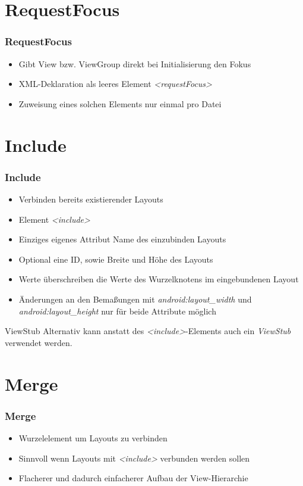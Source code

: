 \section{RequestFocus}
\begin{frame}
   \frametitle{RequestFocus}
   \begin{itemize}
      \item Gibt View bzw. ViewGroup direkt bei Initialisierung den Fokus
      \item XML-Deklaration als leeres Element \emph{\textless{}requestFocus\textgreater}
      \item Zuweisung eines solchen Elements nur einmal pro Datei
   \end{itemize}
\end{frame}

\section{Include}
\begin{frame}
   \frametitle{Include}
   \begin{itemize}
      \item Verbinden bereits existierender Layouts
      \item Element \emph{\textless{}include\textgreater}
      \item Einziges eigenes Attribut Name des einzubinden Layouts
      \item Optional eine ID, sowie Breite und Höhe des Layouts
      \item Werte überschreiben die Werte des Wurzelknotens im eingebundenen Layout
      \item Änderungen an den Bemaßungen mit \emph{android:layout\_width} und 
      	\emph{android:layout\_height} nur für beide Attribute möglich
   \end{itemize}

   \begin{alertblock}{ViewStub}
      Alternativ kann anstatt des \emph{\textless{}include\textgreater}-Elements 
      auch ein \emph{ViewStub} verwendet werden.
   \end{alertblock}
\end{frame}

\section{Merge}
\begin{frame}
   \frametitle{Merge}
   \begin{itemize}
      \item Wurzelelement um Layouts zu verbinden
      \item Sinnvoll wenn Layouts mit \emph{\textless{}include\textgreater} 
         verbunden werden sollen
      \item Flacherer und dadurch einfacherer Aufbau der View-Hierarchie
   \end{itemize}
\end{frame}

